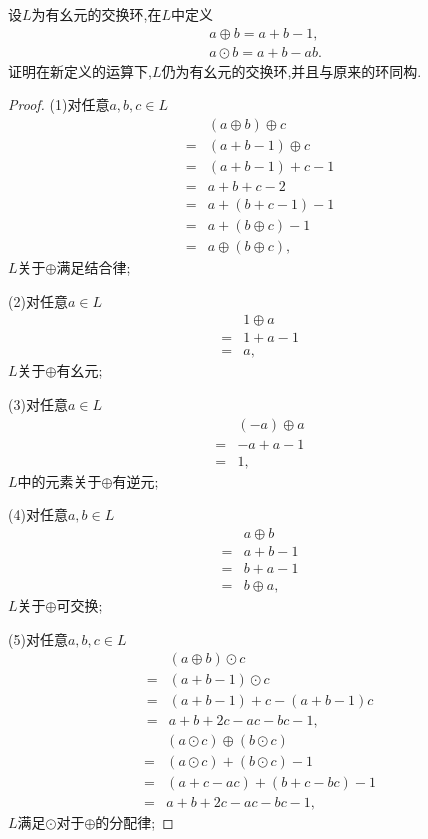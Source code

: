 \begin{problem}[P56T29]
    设$L$为有幺元的交换环,在$L$中定义\begin{align*}
        &a\oplus b=a+b-1,\\
        &a\odot b=a+b-ab.
    \end{align*}证明在新定义的运算下,$L$仍为有幺元的交换环,并且与原来的环同构.
\end{problem}
\begin{proof}
    (1)对任意$a,b,c\in L$\begin{align*}
        &(a\oplus b)\oplus c\\
        =&(a+b-1)\oplus c\\
        =&(a+b-1)+c-1\\
        =&a+b+c-2\\
        =&a+(b+c-1)-1\\
        =&a+(b\oplus c)-1\\
        =&a\oplus(b\oplus c),
    \end{align*}$L$关于$\oplus$满足结合律;

    (2)对任意$a\in L$\begin{align*}
        &1\oplus a\\
        =&1+a-1\\
        =&a,
    \end{align*}$L$关于$\oplus$有幺元;

    (3)对任意$a\in L$\begin{align*}
        &(-a)\oplus a\\
        =&-a+a-1\\
        =&1,
    \end{align*}$L$中的元素关于$\oplus$有逆元;

    (4)对任意$a,b\in L$\begin{align*}
        &a\oplus b\\
        =&a+b-1\\
        =&b+a-1\\
        =&b\oplus a,
    \end{align*}$L$关于$\oplus$可交换;

    (5)对任意$a,b,c\in L$\begin{align*}
        &(a\oplus b)\odot c\\
        =&(a+b-1)\odot c\\
        =&(a+b-1)+c-(a+b-1)c\\
        =&a+b+2c-ac-bc-1,
    \end{align*}\begin{align*}
        &(a\odot c)\oplus(b\odot c)\\
        =&(a\odot c)+(b\odot c)-1\\
        =&(a+c-ac)+(b+c-bc)-1\\
        =&a+b+2c-ac-bc-1,
    \end{align*}$L$满足$\odot$对于$\oplus$的分配律;


\end{proof}
